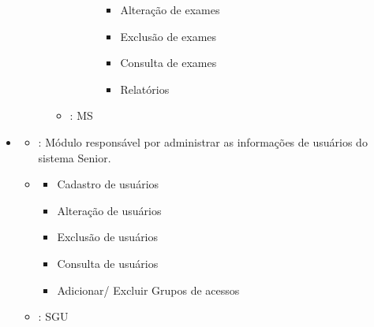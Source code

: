 \documentclass[letterpaper,10pt,brazil]{sphinxmanual}
\begin{document}
\begin{itemize}
\begin{description}
\begin{itemize}
\begin{description}
\begin{itemize}
\item {} 
\sphinxAtStartPar
Alteração de exames

\item {} 
\sphinxAtStartPar
Exclusão de exames

\item {} 
\sphinxAtStartPar
Consulta de exames

\item {} 
\sphinxAtStartPar
Relatórios

\end{itemize}

\end{description}

\item {} 
\sphinxAtStartPar
{}: MS

\end{itemize}

\end{description}

\item {} \begin{description}
\begin{itemize}
\item {} 
\sphinxAtStartPar
{}: Módulo responsável por administrar as informações de usuários do sistema Senior.

\item {} \begin{description}
\begin{itemize}
\item {} 
\sphinxAtStartPar
Cadastro de usuários

\item {} 
\sphinxAtStartPar
Alteração de usuários

\item {} 
\sphinxAtStartPar
Exclusão de usuários

\item {} 
\sphinxAtStartPar
Consulta de usuários

\item {} 
\sphinxAtStartPar
Adicionar/ Excluir Grupos de acessos

\end{itemize}

\end{description}

\item {} 
\sphinxAtStartPar
{}: SGU

\end{itemize}

\end{description}

\end{itemize}
\end{document}
